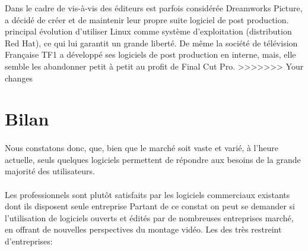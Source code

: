 \begin{itemize}
Dans le cadre de %
vis-à-vis des éditeurs est parfois considérée %
Dreamworks Picture, a décidé de créer et de maintenir leur propre
suite logiciel \cite {Dreamworks} de post production. %
principal %
évolution %
d'utiliser Linux comme système d'exploitation (distribution Red Hat),
ce qui lui garantit un grande liberté. De même la société
de télévision Française TF1 a développé ses logiciels de post
production en interne, mais, elle semble les abandonner petit à petit
au profit de Final Cut Pro.
>>>>>>> Your changes

\newpage

\section {Bilan}

\paragraph { }

Nous constatons donc, que, bien que le marché soit vaste et varié,
à l'heure actuelle, seuls quelques logiciels permettent de répondre
aux besoins de la grande majorité des utilisateurs.

\paragraph{}

Les professionnels sont plutôt satisfaits par les logiciels commerciaux
existants dont ils disposent %
seule entreprise %
Partant de ce constat on peut se demander
si l'utilisation de logiciels ouverts et édités par de nombreuses
entreprises %
marché, en offrant de nouvelles perspectives %
du montage vidéo. Les %
des %
très restreint d'entreprises:


\end{itemize}

